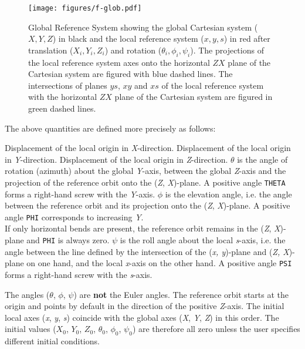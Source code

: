 \begin{figure}[htb]%
\centering
\setlength{\unitlength}{1pt}
\texttt{[image: figures/f-glob.pdf]}
\caption[Global Reference System]{Global Reference System showing the global 
Cartesian system ($X, Y, Z$) in black and the local reference system ($x, y, 
s$) in red after translation ($X_i , Y_i, Z_i$) and rotation ($\theta_i, 
\phi_i, \psi_i$). The projections of the local reference system axes onto the 
horizontal $ZX$ plane of the Cartesian system are figured with blue dashed 
lines. The intersections of planes $ys$, $xy$ and $xs$ of the local reference 
system with the horizontal $ZX$ plane of the Cartesian system are figured in 
green dashed lines. }
\label{F-GLOB}
\end{figure}



The above quantities are defined more precisely as follows:  
\begin{madlist}
    Displacement of the local origin in \textit{X}-direction. 
    Displacement of the local origin in \textit{Y}-direction. 
    Displacement of the local origin in \textit{Z}-direction. 
    $\theta$ is the angle of rotation (azimuth) about the
     global \textit{Y}-axis, between the global \textit{Z}-axis and the
     projection of the reference orbit onto the (\textit{Z},
     \textit{X})-plane. A positive angle \texttt{THETA} forms a
     right-hand screw with the \textit{Y}-axis. 
    $\phi$ is the elevation angle, i.e. the angle between the
     reference orbit and its projection onto the (\textit{Z},
     \textit{X})-plane. A positive angle \texttt{PHI} corresponds to
     increasing \textit{Y}. \\ 
     If only horizontal bends are present, the reference
     orbit remains in the (\textit{Z}, \textit{X})-plane and
     \texttt{PHI} is always zero. 
    $\psi$ is the roll angle about the local \textit{s}-axis,
     i.e. the angle between the line defined by the intersection of the 
     (\textit{x, y})-plane and (\textit{Z, X})-plane on one hand, and
     the local \textit{x}-axis on the other hand. 
     A positive angle \texttt{PSI} forms a right-hand screw with the
     \textit{s}-axis. 
\end{madlist} 

The angles ($\theta$, $\phi$, $\psi$) are \textbf{not} the Euler
angles. The reference orbit starts at the origin and points by default
in the direction of the positive \textit{Z}-axis. The initial local axes
(\textit{x}, \textit{y}, \textit{s})  coincide with the global axes
(\textit{X}, \textit{Y}, \textit{Z}) in this order. The initial values
($X_0$, $Y_0$, $Z_0$, $\theta_0$, $\phi_0$, $\psi_0$) are therefore all zero
unless the user specifies different initial conditions.  

